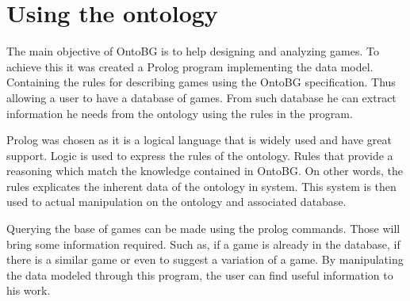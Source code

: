 \section{Using the ontology}

The main objective of OntoBG is to help designing and analyzing games. To achieve this it was created a Prolog program implementing the data model. Containing the rules for describing games using the OntoBG specification. Thus allowing a user to have a database of games. From such database he can extract information he needs from the ontology using the rules in the program.

Prolog was chosen as it is a logical language that is widely used and have great support. Logic is used to express the rules of the ontology. Rules that provide a reasoning which match the knowledge contained in OntoBG. On other words, the rules explicates the inherent data of the ontology in system. This system is then used to actual manipulation on the ontology and associated database. 

Querying the base of games can be made using the prolog commands. Those will bring some information required. Such as, if a game is already in the database, if there is a similar game or even to suggest a variation of a game. By manipulating the data modeled through this program, the user can find useful information to his work. 